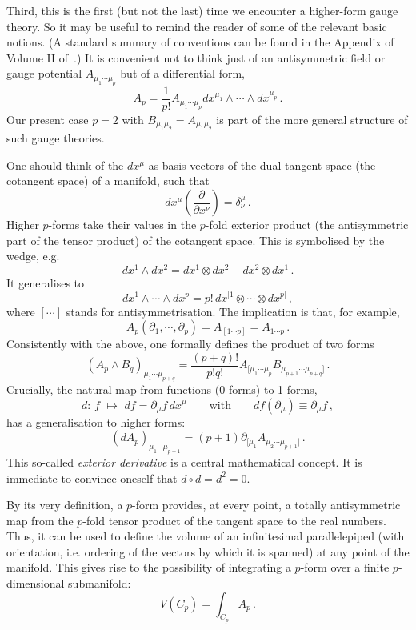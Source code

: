 \documentclass[12pt]{article}
\newcommand{\be}{\begin{equation}}
\newcommand{\ee}{\end{equation}}
\numberwithin{equation}{section}
\begin{document}
Third, this is the first (but not the last) time we encounter a higher-form gauge theory. So it may be useful to remind the reader of some of the relevant basic notions. (A standard summary of conventions can be found in the Appendix of Volume II of~\cite{Polchinski:1998rq}.) It is convenient not to think just of an antisymmetric field or gauge potential $A_{\mu_1\cdots\mu_p}$ but of a differential form,
\be
A_p=\frac{1}{p!}A_{\mu_1\cdots\mu_p}dx^{\mu_1}\wedge \cdots\wedge dx^{\mu_p}\,.
\ee
Our present case $p=2$ with $B_{\mu_1\mu_2}=A_{\mu_1\mu_2}$ is part of the more general structure of such gauge theories.

One should think of the $dx^\mu$ as basis vectors of the dual tangent space (the cotangent space) of a manifold, such that
\be
dx^\mu\left(\frac{\partial}{\partial x^\nu}\right)=\delta^\mu_\nu\,.
\ee
Higher $p$-forms take their values in the $p$-fold exterior product (the antisymmetric part of the tensor product) of the cotangent space. This is symbolised by the wedge, e.g.
\be
dx^1\wedge dx^2=dx^1\otimes dx^2-dx^2\otimes dx^1\,.
\ee
It generalises to 
\be
dx^1\wedge \cdots \wedge dx^p=p!\, dx^{[1}\otimes\cdots\otimes dx^{p]}\,,
\ee
where $[\cdots]$ stands for antisymmetrisation. The implication is that, for example,
\be
A_p(\partial_1,\cdots,\partial_p)=A_{[1\cdots p]}=A_{1\cdots p}\,.
\ee
Consistently with the above, one formally defines the product of two forms
\be
(A_p\wedge B_q)_{\mu_1\cdots\mu_{p+q}}=\frac{(p+q)!}{p!q!}A_{[\mu_1\cdots \mu_p} B_{\mu_{p+1}\cdots \mu_{p+q}]}\,.
\ee
Crucially, the natural map from functions (0-forms) to 1-forms,
\be
d:\,f\,\,\mapsto\,\,df=\partial_\mu f\,dx^\mu\qquad \mbox{with}\qquad 
df(\partial_\mu)\equiv \partial_\mu f\,,
\ee
has a generalisation to higher forms:
\be
(dA_p)_{\mu_1\cdots\mu_{p+1}}=(p+1)\partial_{[\mu_1}A_{\mu_2\cdots\mu_{p+1}]} \,.
\ee
This so-called {\it exterior derivative} is a central mathematical concept. It is immediate to convince oneself that $d\circ d =d^2=0$.

By its very definition, a $p$-form provides, at every point, a totally antisymmetric map from the $p$-fold tensor product of the tangent space to the real numbers. Thus, it can be used to define the volume of an infinitesimal parallelepiped (with orientation, i.e. ordering of the vectors by which it is spanned) at any point of the manifold. This gives rise to the possibility of integrating a $p$-form over a finite $p$-dimensional submanifold:
\be
V(C_p)=\int_{C_p}A_p\,.
\ee
\end{document}
